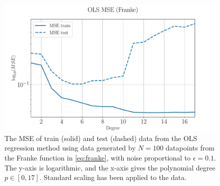 \documentclass[%
reprint,
amsmath,amssymb,
aps,
pra,
]{revtex4-2}
\begin{document}
\begin{figure}[H]
	\centering
	\includegraphics[width=\linewidth]{Python/Figures/OLS/OLS_MSE_StandardScaling.pdf}
	\caption{The MSE of train (solid) and test (dashed) data from the OLS regression method using data generated by \(N=100\) datapoints from the Franke function in \eqref{eq:franke}, with noise proportional to \(\epsilon=0.1\). The y-axis is logarithmic, and the x-axis gives the polynomial degree \(p\in[0,17]\). Standard scaling has been applied to the data.}
	\label{fig:OLS_mse_degree_standard}
\end{figure}
\end{document}
